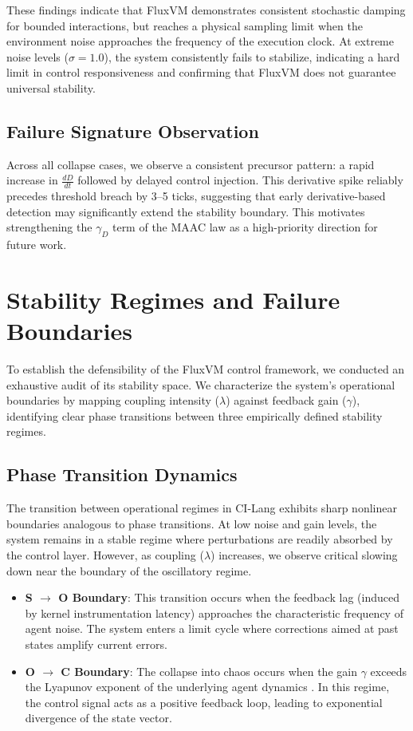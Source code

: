 \documentclass{article}
\begin{document}
These findings indicate that FluxVM demonstrates consistent stochastic damping for bounded interactions, but reaches a physical sampling limit when the environment noise approaches the frequency of the execution clock. At extreme noise levels ($\sigma = 1.0$), the system consistently fails to stabilize, indicating a hard limit in control responsiveness and confirming that FluxVM does not guarantee universal stability.

\subsection*{Failure Signature Observation}
Across all collapse cases, we observe a consistent precursor pattern: a rapid increase in $\frac{dD}{dt}$ followed by delayed control injection. This derivative spike reliably precedes threshold breach by 3--5 ticks, suggesting that early derivative-based detection may significantly extend the stability boundary. This motivates strengthening the $\gamma_D$ term of the MAAC law as a high-priority direction for future work.

\newpage

\section{Stability Regimes and Failure Boundaries}
\label{sec:failure_boundaries}

To establish the defensibility of the FluxVM control framework, we conducted an exhaustive audit of its stability space. We characterize the system's operational boundaries by mapping coupling intensity ($\lambda$) against feedback gain ($\gamma$), identifying clear phase transitions between three empirically defined stability regimes.

\subsection{Phase Transition Dynamics}
The transition between operational regimes in CI-Lang exhibits sharp nonlinear boundaries analogous to phase transitions. At low noise and gain levels, the system remains in a stable regime where perturbations are readily absorbed by the control layer. However, as coupling ($\lambda$) increases, we observe critical slowing down near the boundary of the oscillatory regime.
\begin{itemize}
    \item \textbf{S $\to$ O Boundary}: This transition occurs when the feedback lag (induced by kernel instrumentation latency) approaches the characteristic frequency of agent noise. The system enters a limit cycle where corrections aimed at past states amplify current errors.
    \item \textbf{O $\to$ C Boundary}: The collapse into chaos occurs when the gain $\gamma$ exceeds the Lyapunov exponent of the underlying agent dynamics \cite{khalil2002nonlinear}. In this regime, the control signal acts as a positive feedback loop, leading to exponential divergence of the state vector.
\end{itemize}
\end{document}
